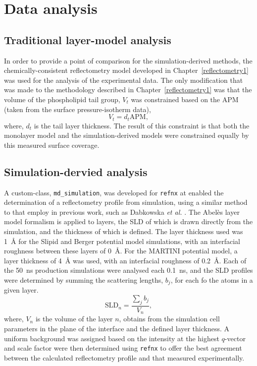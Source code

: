 \section{Data analysis}
\subsection{Traditional layer-model analysis}
In order to provide a point of comparison for the simulation-derived methods, the chemically-consistent reflectometry model developed in Chapter~\ref{reflectometry1} was used for the analysis of the experimental data.
The only modification that was made to the methodology described in Chapter~\ref{reflectometry1} was that the volume of the phospholipid tail group, $V_t$ was constrained based on the APM (taken from the surface pressure-isotherm data),
%
\begin{equation}
V_t = d_t\text{APM},
\end{equation}
%
where, $d_t$ is the tail layer thickness. The result of this constraint is that both the monolayer model and the simulation-derived models were constrained equally by this measured surface coverage.

\subsection{Simulation-dervied analysis}
A custom-class, \texttt{md\_simulation}, was developed for \texttt{refnx} \cite{nelson_refnx_2019,nelson_refnx_2019-1} at enabled the determination of a reflectometry profile from simulation, using a similar method to that employ in previous work, such as Dabkowska \emph{et al.} \cite{dabkowska_modulation_2014}.
The Abel\`{e}s layer model formalism is applied to layers, the SLD of which is drawn directly from the simulation, and the thickness of which is defined.
The layer thickness used was \SI{1}{\angstrom} for the Slipid and Berger potential model simulations, with an interfacial roughness between these layers of \SI{0}{\angstrom}.
For the MARTINI potential model, a layer thickness of \SI{4}{\angstrom} was used, with an interfacial roughness of \SI{0.2}{\angstrom}. Each of the \SI{50}{\nano\second} production simulations were analysed each \SI{0.1}{\nano\second}, and the SLD profiles were determined by summing the scattering lengths, $b_j$, for each fo the atoms in a given layer.
%
\begin{equation}
\text{SLD}_n = \frac{\sum_j b_j}{V_n},
\end{equation}
%
where, $V_n$ is the volume of the layer $n$, obtains from the simulation cell parameters in the plane of the interface and the defined layer thickness.
A uniform background was assigned based on the intensity at the highest $q$-vector and scale factor were then determined using \texttt{refnx} to offer the best agreement between the calculated reflectometry profile and that measured experimentally.

